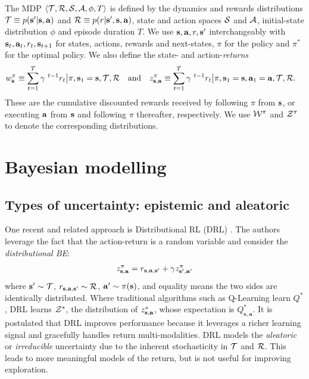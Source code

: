 \documentclass{article}
\begin{document}
The MDP $\langle \mathcal{T}, \mathcal{R}, \mathcal{S}, \mathcal{A}, \phi, T \rangle$ is defined by the dynamics and rewards distributions $\mathcal{T} \equiv p(\mathbf{s}' | \mathbf{s}, \mathbf{a})$ and $\mathcal{R} \equiv p(r | \mathbf{s}', \mathbf{s}, \mathbf{a})$, state and action spaces $\mathcal{S}$ and $\mathcal{A}$, initial-state distribution $\phi$ and episode duration $T$. We use $\mathbf{s}, \mathbf{a}, r, \mathbf{s}'$ interchangeably with $\mathbf{s}_t, \mathbf{a}_t, r_t, \mathbf{s}_{t+1}$ for states, actions, rewards and next-states, $\pi$ for the policy and $\pi^*$ for the optimal policy. We also define the state- and action-\textit{returns}
\begin{align}
w^\pi_{\mathbf{s}} \equiv \sum_{t = 1}^T \gamma^{~t - 1} r_t \big| \pi, \mathbf{s}_1 = \mathbf{s}, \mathcal{T}, \mathcal{R} ~~\text{ and }~~z^\pi_{\mathbf{s}, \mathbf{a}} &\equiv \sum_{t = 1}^T \gamma^{~t - 1} r_t \big| \pi, \mathbf{s}_1 = \mathbf{s}, \mathbf{a}_1 = \mathbf{a}, \mathcal{T}, \mathcal{R}.
\end{align}
These are the cumulative discounted rewards received by following $\pi$ from $\mathbf{s}$, or executing $\mathbf{a}$ from $\mathbf{s}$ and following $\pi$ thereafter, respectively. We use $\mathcal{W}^\pi$ and $\mathcal{Z}^\pi$ to denote the corresponding distributions.

\section{Bayesian modelling}

\subsection{Types of uncertainty: epistemic and aleatoric}

One recent and related approach is Distributional RL (DRL) \citep{distperrl}. The authors leverage the fact that the action-return is a random variable and consider the \textit{distributional BE}:
\begin{align} \label{eq:distributional}
z^\pi_{\mathbf{s}, \mathbf{a}} = r_{\mathbf{s}, \mathbf{a}, \mathbf{s}'} + \gamma z^\pi_{\mathbf{s}', \mathbf{a}'}
\end{align}
where $\mathbf{s}' \sim \mathcal{T}$, $r_{\mathbf{s}, \mathbf{a}, \mathbf{s}'} \sim \mathcal{R}$, $\mathbf{a}' \sim \pi(\mathbf{s})$, and equality means the two sides are identically distributed. Where traditional algorithms such as Q-Learning \citep{qlearning} learn $Q^*$, DRL learns $\mathcal{Z}^*$, the distribution of $z^*_{\mathbf{s}, \mathbf{a}}$, whose expectation is $Q^*_{\mathbf{s}, \mathbf{a}}$. It is postulated that DRL improves performance because it leverages a richer learning signal and gracefully handles return multi-modalities. DRL models the \textit{aleatoric} or \textit{irreducible} uncertainty due to the inherent stochasticity in $\mathcal{T}$ and $\mathcal{R}$. This leads to more meaningful models of the return, but is not useful for improving exploration.
\end{document}

